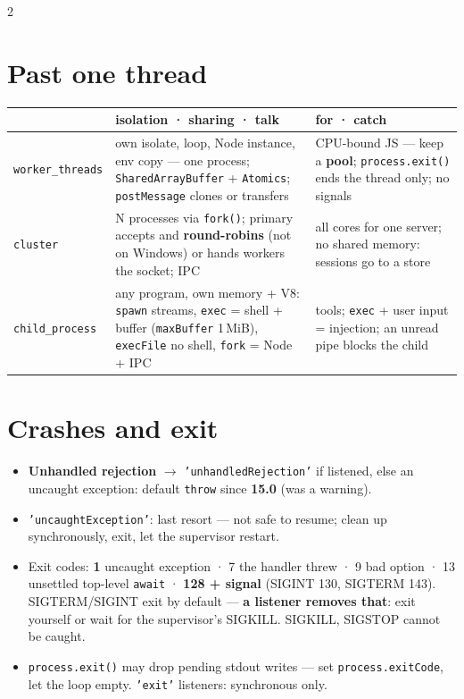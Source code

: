 \documentclass[8pt]{extarticle}
\newcommand\ct[1]{\texttt{#1}}
\begin{document}
\begin{multicols}{2}
\columnbreak

\section{Past one thread}
{\scriptsize\renewcommand{\arraystretch}{1.05}\setlength{\tabcolsep}{2pt}
\begin{tabular}{@{}>{\raggedright}p{13mm}>{\raggedright}p{36mm}>{\raggedright\arraybackslash}p{27mm}@{}}
\toprule
 & \textbf{isolation · sharing · talk} & \textbf{for · catch}\\
\midrule
\ct{worker\_}\allowbreak\ct{threads} & own isolate, loop, Node instance, env copy — one process; \ct{SharedArrayBuffer} + \ct{Atomics}; \ct{postMessage} clones or transfers & CPU-bound JS — keep a \textbf{pool}; \ct{process.exit()} ends the thread only; no signals\\
\ct{cluster} & N processes via \ct{fork()}; primary accepts and \textbf{round-robins} (not on Windows) or hands workers the socket; IPC & all cores for one server; no shared memory: sessions go to a store\\
\ct{child\_}\allowbreak\ct{process} & any program, own memory + V8: \ct{spawn} streams, \ct{exec} = shell + buffer (\ct{maxBuffer} 1\,MiB), \ct{execFile} no shell, \ct{fork} = Node + IPC & tools; \ct{exec} + user input = injection; an unread pipe blocks the child\\
\bottomrule
\end{tabular}}

\section{Crashes and exit}
\begin{itemize}
  \item \textbf{Unhandled rejection} $\to$ \ct{'unhandledRejection'} if listened, else an
        uncaught exception: default \ct{throw} since \textbf{15.0} (was a warning).
  \item \ct{'uncaughtException'}: last resort — not safe to resume; clean up synchronously,
        exit, let the supervisor restart.
  \item Exit codes: \textbf{1} uncaught exception · 7 the handler threw · 9 bad option · 13
        unsettled top-level \ct{await} · \textbf{128 + signal} (SIGINT 130, SIGTERM 143).
        SIGTERM/SIGINT exit by default — \textbf{a listener removes that}: exit yourself or
        wait for the supervisor's SIGKILL. SIGKILL, SIGSTOP cannot be caught.
  \item \ct{process.exit()} may drop pending stdout writes — set \ct{process.exitCode}, let
        the loop empty. \ct{'exit'} listeners: synchronous only.
\end{itemize}


\end{multicols}
\end{document}
